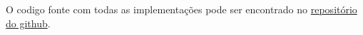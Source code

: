 \documentclass{sbc2023}%
\begin{document}
\begin{materials}
O codigo fonte com todas as implementações pode ser encontrado no \href{https://github.com/JoaoCominii/ESTUDOS/tree/main/Mat%C3%A9rias/Teoria%20dos%20Grafos%20e%20Computabilidade/2%20-%20Projetos/TRABALHO%20PR%C3%81TICO%20N.01/CODIGOS}{repositório do github}.

\end{materials}




\end{document}
